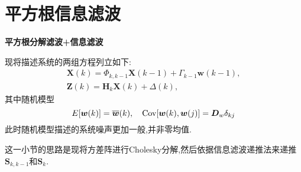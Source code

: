 \documentclass[cn,10pt,citestyle=gb7714-2015,bibstyle=gb7714-2015]{elegantbook}
\renewcommand{\emph}[1]{\textbf{#1}}%
\newcommand{\Cov}{\textup{Cov}}
\begin{document}
\section{平方根信息滤波}
\begin{center}
  \emph{平方根分解滤波+信息滤波}
\end{center}
现将描述系统的两组方程列立如下:
\begin{gather}
  \bm{X}(k)=\bm{\varPhi}_{k,k-1}\bm{X}(k-1)+\bm{\varGamma}_{k-1}\bm{w}(k-1),\label{eq:square-root-information-state-equation-1}\\
  \bm{Z}(k)=\bm{H}_k\bm{X}(k)+\bm{\varDelta}(k),\label{eq:square-root-information-state-equation-2}
\end{gather}
其中随机模型
\[
  E[\bm{w}(k)]=\overline{\bm{w}}(k),\quad\Cov[\bm{w}(k),\bm{w}(j)]=\bm{D}_w\delta_{kj}
\]
此时随机模型描述的系统噪声更加一般,并非零均值.

这一小节的思路是现将方差阵进行Cholesky分解,然后依据信息滤波递推法来递推$\bm{S}_{k,k-1}$和$\bm{S}_k$.
\end{document}
